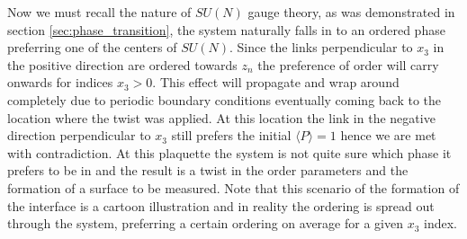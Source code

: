 \documentclass[english,twoside,openright]{UH_TCM_MSc}
\begin{document}
Now we must recall the nature of $SU(N)$ gauge theory, as was demonstrated in section \ref{sec:phase_transition}, the system naturally falls in to an ordered phase preferring one of the centers of $SU(N)$. Since the links perpendicular to $x_3$ in the positive direction are ordered towards $z_n$ the preference of order will carry onwards for indices $x_3 > 0$. This  effect will propagate and wrap around completely due to periodic boundary conditions eventually coming back to the location where the twist was applied. At this location the link in the negative direction perpendicular to $x_3$ still prefers the initial $\langle P \rangle = 1$ hence we are met with contradiction. At this plaquette the system is not quite sure which phase it prefers to be in and the result is a twist in the order parameters and the formation of a surface to be measured. Note that this scenario of the formation of the interface is a cartoon illustration and in reality the ordering is spread out through the system, preferring a certain ordering on average for a given $x_3$ index.
\end{document}
